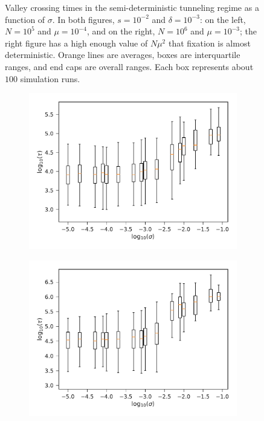 \documentclass[10pt,twocolumn,twoside]{gsajnl}
\begin{document}
\begin{spacing}{1.5}
\begin{figure}[t]
\begin{subfigure}[b]{0.4\textwidth}
\end{subfigure}
\caption{Valley crossing times in the semi-deterministic tunneling regime as a function of $\sigma$. In both figures, $s = 10^{-2}$ and $\delta = 10^{-3}$: on the left, $N = 10^5$ and $\mu = 10^{-4}$, and on the right, $N = 10^6$ and $\mu = 10^{-3}$; the right figure has a high enough value of $N\mu^2$ that fixation is almost deterministic. Orange lines are averages, boxes are interquartile ranges, and end caps are overall ranges. Each box represents about $100$ simulation runs.}
\label{fig:deterministic}
\end{figure}

\begin{figure}[t]
\begin{subfigure}[b]{0.4\textwidth}
\includegraphics[width=\textwidth]{Figures/seq_fix.pdf}
\end{subfigure}
\begin{subfigure}[b]{0.4\textwidth}
\includegraphics[width=\textwidth]{Figures/neut_tunnel.pdf}

\end{subfigure}
\end{figure}
\end{spacing}
\end{document}
